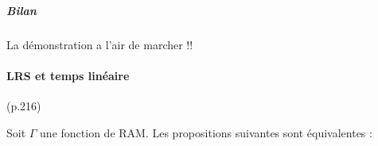 \documentclass{article}
\begin{document}
		
		\subparagraph{Bilan}
		
		
		La démonstration a l'air de marcher !!
		
		
		
	\paragraph{LRS et temps linéaire} (p.216)
	
	\begin{conj}
		Soit $\Gamma$ une fonction de RAM. Les propositions suivantes sont équivalentes :
		
		\begin{enumerate}[itemsep=-1mm]

		\end{enumerate}
	\end{conj}
		
\end{document}
